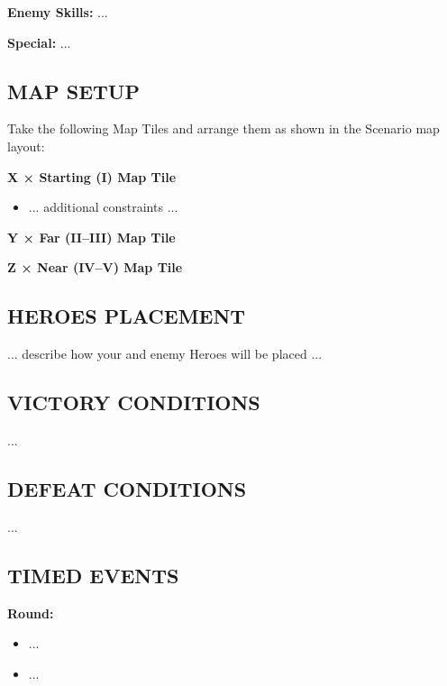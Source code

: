 \begin{multicols*}{2}
\textbf{Enemy Skills:} ...

\textbf{Special:} ...

\subsection*{\MakeUppercase{Map Setup}}

Take the following Map Tiles and arrange them as shown in the Scenario map layout:

\textbf{X × Starting (I) Map Tile}
\begin{itemize}
    \item ... additional constraints ...
\end{itemize}

\textbf{Y × Far (II--III) Map Tile}

\textbf{Z × Near (IV--V) Map Tile}

\subsection*{\MakeUppercase{Heroes Placement}}

... describe how your and enemy Heroes will be placed ...

\subsection*{\MakeUppercase{Victory Conditions}}
...

\subsection*{\MakeUppercase{Defeat Conditions}}
...

\subsection*{\MakeUppercase{Timed Events}}

%

\textbf{ Round:}
\begin{itemize}
  \item ...
  \item ...
\end{itemize}

%
%
%


\end{multicols*}
